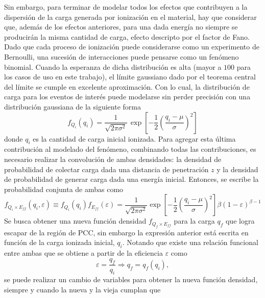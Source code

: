 Sin embargo, para terminar de modelar todos los efectos que contribuyen a la dispersión de la carga generada por ionización en el material, hay que considerar que, además de los efectos anteriores, para una dada energía no siempre se producirán la misma cantidad de carga, efecto descripto por el factor de Fano. Dado que cada proceso de ionización puede considerarse como un experimento de Bernoulli, una sucesión de interacciones puede pensarse como un fenómeno binomial. Cuando la esperanza de dicha distribución es alta (mayor a $100$ para los casos de uso en este trabajo), el límite gaussiano dado por el teorema central del límite se cumple en excelente aproximación. Con lo cual, la distribución de carga para los eventos de interés puede modelarse sin perder precisión con una distribución gaussiana de la siguiente forma
\begin{equation*}
    f_{Q_{i}}(q_{i}) = 
    \frac{1}{\sqrt{2\pi \sigma^{2}}}\,
    \exp
        \left[
            -\frac{1}{2}
            \left(
                \frac{q_{i} - \mu}{\sigma}
            \right)^{2}
        \right]
\end{equation*}
donde $q_{i}$ es la cantidad de carga inicial ionizada. Para agregar esta última contribución al modelado del fenómeno, combinando todas las contribuciones, es necesario realizar la convolución de ambas densidades: la densidad de probabilidad de colectar carga dada una distancia de penetración $z$ y la densidad de probabilidad de generar carga dada una energía inicial. Entonces, se escribe la probabilidad conjunta de ambas como
\begin{equation*}
    f_{Q_{i} \times E_{ff}} (q_{i}, \varepsilon)
    \equiv f_{Q_{i}}(q_{i}) f_{E_{ff}}(\varepsilon)
    =
    \frac{1}{\sqrt{2\pi \sigma^{2}}}
    \exp
        \left[
            -\frac{1}{2}
            \left(
                \frac{q_{i} - \mu}{\sigma}
            \right)^{2}
        \right]
    \beta(1-\varepsilon)^{\beta - 1}
\end{equation*}
Se busca obtener una nueva función densidad $f_{Q_{f}\times E_{ff}}$ para la carga $q_{f}$ que logra escapar de la región de PCC, sin embargo la expresión anterior está escrita en función de la carga ionizada inicial, $q_{i}$. Notando que existe una relación funcional entre ambas que se obtiene a partir de la eficiencia $\varepsilon$ como
\begin{equation*}
    \varepsilon = \frac{q_{f}}{q_{i}}
    \Longrightarrow
    q_{f} = q_{f}(q_{i}),
\end{equation*}
se puede realizar un cambio de variables para obtener la nueva función densidad, siempre y cuando la nueva y la vieja cumplan que
